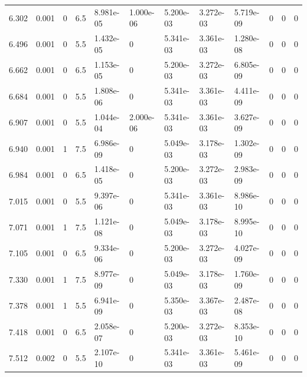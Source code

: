 \documentclass[preview]{standalone}
\begin{document}
{{{\begin{tabular}{L{1.2cm}C{1.2cm} C{0.3cm}C{0.5cm} C{1.4cm}C{1.4cm} C{1.4cm}C{1.4cm} C{1.6cm}C{1.6cm} C{1.6cm}C{1.6cm}}
  6.302  &  0.001  & 0     & 6.5 &  8.981e-05  & 1.000e-06  &  5.200e-03&   3.272e-03& 5.719e-09 & 0   &  0 & 0  \\ 
  6.496  &  0.001  & 0     & 5.5 &  1.432e-05  & 0  &  5.341e-03&   3.361e-03& 1.280e-08 & 0   &  0 & 0  \\ 
  6.662  &  0.001  & 0     & 6.5 &  1.153e-05  & 0  &  5.200e-03&   3.272e-03& 6.805e-09 & 0   &  0 & 0  \\ 
  6.684  &  0.001  & 0     & 5.5 &  1.808e-06  & 0  &  5.341e-03&   3.361e-03& 4.411e-09 & 0   &  0 & 0  \\ 
  6.907  &  0.001  & 0     & 5.5 &  1.044e-04  & 2.000e-06  &  5.341e-03&   3.361e-03& 3.627e-09 & 0   &  0 & 0  \\ 
  6.940  &  0.001  & 1     & 7.5 &  6.986e-09  & 0  &  5.049e-03&   3.178e-03& 1.302e-09 & 0   &  0 & 0  \\ 
  6.984  &  0.001  & 0     & 6.5 &  1.418e-05  & 0  &  5.200e-03&   3.272e-03& 2.983e-09 & 0   &  0 & 0  \\ 
  7.015  &  0.001  & 0     & 5.5 &  9.397e-06  & 0  &  5.341e-03&   3.361e-03& 8.986e-10 & 0   &  0 & 0  \\ 
  7.071  &  0.001  & 1     & 7.5 &  1.121e-08  & 0  &  5.049e-03&   3.178e-03& 8.995e-10 & 0   &  0 & 0  \\ 
  7.105  &  0.001  & 0     & 6.5 &  9.334e-06  & 0  &  5.200e-03&   3.272e-03& 4.027e-09 & 0   &  0 & 0  \\ 
  7.330  &  0.001  & 1     & 7.5 &  8.977e-09  & 0  &  5.049e-03&   3.178e-03& 1.760e-09 & 0   &  0 & 0  \\ 
  7.378  &  0.001  & 1     & 5.5 &  6.941e-09  & 0  &  5.350e-03&   3.367e-03& 2.487e-08 & 0   &  0 & 0  \\ 
  7.418  &  0.001  & 0     & 6.5 &  2.058e-07  & 0  &  5.200e-03&   3.272e-03& 8.353e-10 & 0   &  0 & 0  \\ 
  7.512  &  0.002  & 0     & 5.5 &  2.107e-10  & 0  &  5.341e-03&   3.361e-03& 5.461e-09 & 0   &  0 & 0  \\ 
\hline 
\end{tabular} 

}}}
\end{document}
